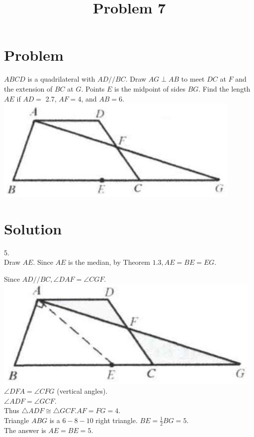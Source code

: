 \documentclass{article}
\title{Problem 7}
\date{}
\begin{document}
\maketitle

\section*{Problem}
\(A B C D\) is a quadrilateral with \(A D / / B C\). Draw \(A G \perp A B\) to meet \(D C\) at \(F\) and the extension of \(B C\) at \(G\). Points \(E\) is the midpoint of sides \(B G\). Find the length \(A E\) if \(A D=\) 2.7, \(A F=4\), and \(A B=6\).\\
\centering
\includegraphics[width=\textwidth]{images/problem_image_1.jpg}

\section*{Solution}
5.\\
Draw \(A E\). Since \(A E\) is the median, by Theorem \(1.3, A E=B E=E G\).

Since \(A D / / B C, \angle D A F=\angle C G F\).\\
\centering
\includegraphics[width=\textwidth]{images/reasoning_image_1.jpg}\\
\(\angle D F A=\angle C F G\) (vertical angles).\\
\(\angle A D F=\angle G C F\).\\
Thus \(\triangle A D F \cong \triangle G C F . A F=F G=4\).\\
Triangle \(A B G\) is a \(6-8-10\) right triangle. \(B E=\frac{1}{2} B G=5\).\\
The answer is \(A E=B E=5\).
\end{document}
